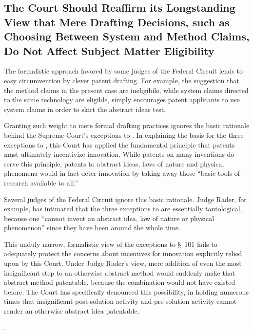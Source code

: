 \documentclass{scotus}
\begin{document}
\subsection{The Court Should Reaffirm its Longstanding View that Mere Drafting
Decisions, such as Choosing Between System and Method Claims, Do Not Affect
Subject Matter Eligibility}

The formalistic approach favored by some judges of the Federal Circuit lends to
easy circumvention by clever patent drafting. For example, the suggestion that
the method claims in the present case are ineligibile, while system claims
directed to the same technology are eligible, simply encourages patent
applicants to use system claims in order to skirt the abstract ideas test.

Granting such weight to mere formal drafting practices ignores the basic
rationale behind the Supreme Court's exceptions to . In explaining
the basis for the three exceptions to , this Court has applied the
fundamental principle that patents must ultimately incentivize innovation. While
patents on many inventions do serve this principle, patents to abstract ideas,
laws of nature and physical phenomena would in fact deter innovation by taking
away those ``basic tools of research available to all.''

Several judges of the Federal Circuit ignore this basic rationale. Judge Rader,
for example, has intimated that the three exceptions to  are
essentially tautological, because one ``cannot invent an abstract idea, law of
nature or physical phenomenon'' since they have been around the whole time.

This unduly narrow, formalistic view of the exceptions to \S~101 fails to
adequately protect the concerns about incentives for innovation explicitly
relied upon by this Court. Under Judge Rader's view, mere addition of even the
most insignificant step to an otherwise abstract method would suddenly make that
abstract method patentable, because the combination would not have existed
before. The Court has specifically denounced this possibility, in holding
numerous times that insignificant post-solution activity and pre-solution
activity cannot render an otherwise abstract idea patentable.

.
\end{document}
